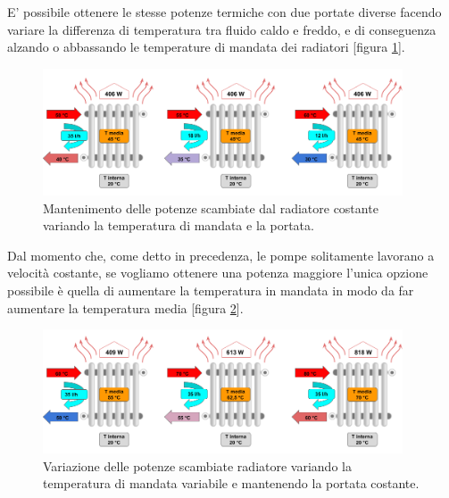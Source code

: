 \documentclass[laurea,oneside,11pt]{USiena_tesiLM}
\begin{document}
E' possibile ottenere  le stesse potenze termiche con due portate diverse facendo variare la differenza di temperatura tra fluido caldo e freddo, e di conseguenza alzando o abbassando le temperature di mandata dei radiatori [figura \ref{fig:portata}]. 

\begin{figure}[h]
\begin{center}
\includegraphics[width=0.95\textwidth]{figure/portata} %
\caption{Mantenimento delle potenze scambiate dal radiatore costante variando la temperatura di mandata e la portata.}
\label{fig:portata}
\end{center}
\end{figure}

Dal momento che, come detto in precedenza, le pompe solitamente lavorano a velocità costante, se vogliamo ottenere una potenza maggiore l'unica opzione possibile è quella di aumentare la temperatura in mandata in modo da far aumentare la temperatura media [figura \ref{fig:portata2}].

\begin{figure}[h]
\begin{center}
\includegraphics[width=0.95\textwidth]{figure/portata2} %
\caption{Variazione delle potenze scambiate radiatore variando la temperatura di mandata variabile e mantenendo la portata costante.}
\label{fig:portata2}
\end{center}
\end{figure}
\end{document}
